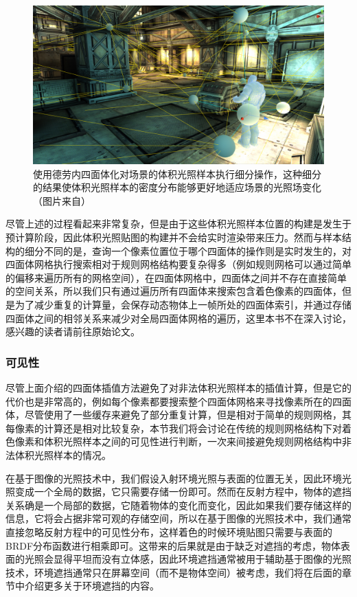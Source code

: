 \begin{figure}
	\includegraphics[width=\textwidth]{figures/pl/delaunay-tetrahedralisation}
	\caption{使用德劳内四面体化对场景的体积光照样本执行细分操作，这种细分的结果使体积光照样本的密度分布能够更好地适应场景的光照场变化（图片来自\cite{a:Lightprobeinterpolationusingtetrahedraltessellations}）}
	\label{f:pl-delaunay-tetrahedralisation}
\end{figure}

尽管上述的过程看起来非常复杂，但是由于这些体积光照样本位置的构建是发生于预计算阶段，因此体积光照贴图的构建并不会给实时渲染带来压力。然而与样本结构的细分不同的是，查询一个像素位置位于哪个四面体的操作则是实时发生的，对四面体网格执行搜索相对于规则网格结构要复杂得多（例如规则网格可以通过简单的偏移来遍历所有的网格空间），在四面体网格中，四面体之间并不存在直接简单的空间关系，所以我们只有通过遍历所有四面体来搜索包含着色像素的四面体，但是为了减少重复的计算量，\cite{a:Leastsquaresconformalmapsforautomatictextureatlasgeneration}会保存动态物体上一帧所处的四面体索引，并通过存储四面体之间的相邻关系来减少对全局四面体网格的遍历，这里本书不在深入讨论，感兴趣的读者请前往原始论文。




\subsubsection{可见性}
尽管上面介绍的四面体插值方法避免了对非法体积光照样本的插值计算，但是它的代价也是非常高的，例如每个像素都要搜索整个四面体网格来寻找像素所在的四面体，尽管\cite{a:Lightprobeinterpolationusingtetrahedraltessellations}使用了一些缓存来避免了部分重复计算，但是相对于简单的规则网格，其每像素的计算还是相对比较复杂，本节我们将会讨论在传统的规则网格结构下对着色像素和体积光照样本之间的可见性进行判断，一次来间接避免规则网格结构中非法体积光照样本的情况。

在基于图像的光照技术中，我们假设入射环境光照与表面的位置无关，因此环境光照变成一个全局的数据，它只需要存储一份即可。然而在反射方程中，物体的遮挡关系确是一个局部的数据，它随着物体的变化而变化，因此如果我们要存储这样的信息，它将会占据非常可观的存储空间，所以在基于图像的光照技术中，我们通常直接忽略反射方程中的可见性分布，这样着色的时候环境贴图只需要与表面的BRDF分布函数进行相乘即可。这带来的后果就是由于缺乏对遮挡的考虑，物体表面的光照会显得平坦而没有立体感，因此环境遮挡通常被用于辅助基于图像的光照技术，环境遮挡通常只在屏幕空间（而不是物体空间）被考虑，我们将在后面的章节中介绍更多关于环境遮挡的内容。

